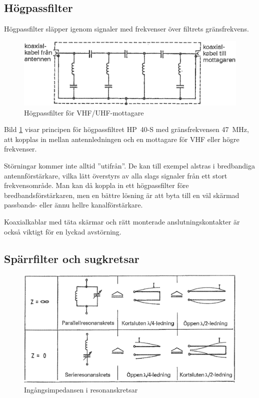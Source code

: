 \subsection{Högpassfilter}

Högpassfilter släpper igenom signaler med frekvenser över filtrets
gränsfrekvens.

\begin{figure}
  \includegraphics[width=\textwidth]{images/cropped_pdfs/bild_2_9-03.pdf}
  \caption{Högpassfilter för VHF/UHF-mottagare}
  \label{fig:bildII9-3}
\end{figure}

Bild \ref{fig:bildII9-3} visar principen för högpassfiltret HP~40-S med
gränsfrekvensen 47~MHz, att kopplas in mellan antennledningen och en
mottagare för VHF eller högre frekvenser.

Störningar kommer inte alltid ''utifrån''.
De kan till exempel alstras i bredbandiga antennförstärkare, vilka lätt överstyrs av
alla slags signaler från ett stort frekvensområde.
Man kan då koppla in ett högpassfilter före bredbandsförstärkaren, men en
bättre lösning är att byta till en väl skärmad passbands- eller ännu hellre
kanalförstärkare.

Koaxialkablar med täta skärmar och rätt monterade anslutningskontakter
är också viktigt för en lyckad avstörning.

\subsection{Spärrfilter och sugkretsar}

\begin{figure}
  \includegraphics[width=\textwidth]{images/cropped_pdfs/bild_2_9-04.pdf}
  \caption{Ingångsimpedansen i resonanskretsar}
  \label{fig:bildII9-4}
\end{figure}

